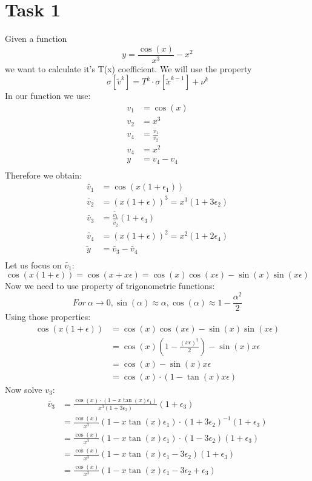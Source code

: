 \documentclass[11pt]{article}
\begin{document}
\section*{Task 1}
Given a function $$y = \frac{\cos(x)}{x^3} - x^2$$ we want to calculate it's T(x) coefficient.
We will use the property 
$$\sigma [\tilde{v}^k] = T^k \cdot \sigma[\tilde{x}^{k-1}] + \nu^k$$
In our function we use:
\begin{align*}
    v_1 &= \cos(x) \\ 
    v_2 &= x^3 \\ 
    v_4 &= \frac{v_1}{v_2} \\ 
    v_4 &= x^2 \\ 
    y &= v_4 - v_4 \\ 
\end{align*}
Therefore we obtain:
\begin{align*}
    \tilde{v_1} &= \cos(x(1+\epsilon_1)) \\ 
    \tilde{v_2} &= (x(1+\epsilon))^3 = x^3 (1+3\epsilon_2) \\ 
    \tilde{v_3} &= \frac{\tilde{v_1}}{\tilde{v_2}}(1+\epsilon_3) \\ 
    \tilde{v_4} &= (x(1+\epsilon))^2 = x^2 (1+2\epsilon_4) \\
    \tilde{y} &= \tilde{v_3} - \tilde{v_4} \\ 
\end{align*}
Let us focus on $\tilde{ v_1 }$:
$$ \cos(x(1+\epsilon)) = \cos(x+x\epsilon) = \cos(x)\cos(x\epsilon) - \sin(x)\sin(x\epsilon) $$
Now we need to use property of trigonometric functions: 
$$For\ \alpha \rightarrow 0, \sin(\alpha) \approx \alpha , \cos(\alpha) \approx 1-\frac{ \alpha^2 }{ 2 }$$
Using those properties:
\begin{align*}
    \cos(x(1+\epsilon)) &= \cos(x)\cos(x\epsilon) - \sin(x)\sin(x\epsilon)\\
    &= \cos(x)(1-\frac{(x\epsilon)^2}{2}) - \sin(x)x\epsilon \\
    &= \cos(x) - \sin(x)x\epsilon\\
    &= \cos(x)\cdot (1-\tan(x)x\epsilon)
\end{align*}
Now solve $v_3$:
\begin{align*}
    \tilde{v_3} &= \displaystyle\frac{\cos(x) \cdot (1 - x\tan(x) \epsilon_1)}{x^3 (1+3\epsilon_2)} (1+\epsilon_3)\\
    &= \frac{\cos(x)}{x^3} (1 - x\tan(x) \epsilon_1)\cdot (1+3\epsilon_2)^{-1}(1+\epsilon_3)\\
    &= \frac{\cos(x)}{x^3} (1 - x\tan(x) \epsilon_1)\cdot (1-3\epsilon_2)(1+\epsilon_3)\\
    &= \frac{\cos(x)}{x^3} (1 - x\tan(x) \epsilon_1 - 3\epsilon_2)(1+\epsilon_3)\\
    &= \frac{\cos(x)}{x^3} (1 - x\tan(x) \epsilon_1 - 3\epsilon_2+\epsilon_3)\\
\end{align*}
\end{document}
